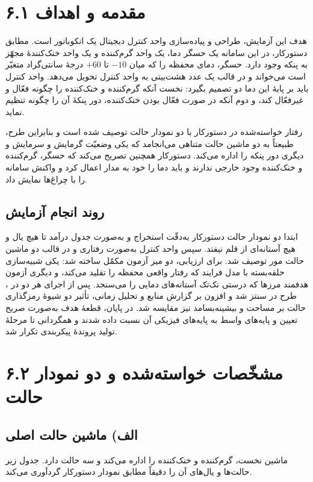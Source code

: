 \documentclass[12pt,a4paper]{article}
\begin{document}

	\section*{۶.۱ مقدمه و اهداف}
	هدف این آزمایش، طراحی و پیاده‌سازی واحد کنترل دیجیتال یک انکوباتور است. مطابق دستورکار، در این سامانه یک حسگر دما، یک واحد گرم‌کننده و یک واحد خنک‌کنندهٔ مجهّز به پنکه وجود دارد. حسگر، دمای محفظه را که میان \(-10\) تا \(+60\) درجهٔ سانتی‌گراد متغیّر است می‌خواند و در قالب یک عدد هشت‌بیتی به واحد کنترل تحویل می‌دهد. واحد کنترل باید بر پایهٔ این دما دو تصمیم بگیرد: نخست آنکه گرم‌کننده و خنک‌کننده را چگونه فعّال و غیرفعّال کند، و دوم آنکه در صورت فعّال بودن خنک‌کننده، دور پنکهٔ آن را چگونه تنظیم نماید.

	رفتار خواسته‌شده در دستورکار با دو نمودار حالت توصیف شده است و بنابراین طرح، طبیعتاً به دو ماشین حالت متناهی می‌انجامد که یکی وضعیّت گرمایش و سرمایش و دیگری دور پنکه را اداره می‌کند. دستورکار همچنین تصریح می‌کند که حسگر، گرم‌کننده و خنک‌کننده وجود خارجی ندارند و باید دما را خود به مدار اعمال کرد و واکنش سامانه را با چراغ‌ها نمایش داد.

	\subsection*{روند انجام آزمایش}
	ابتدا دو نمودار حالت دستورکار به‌دقّت استخراج و به‌صورت جدول درآمد تا هیچ یال و هیچ آستانه‌ای از قلم نیفتد. سپس واحد کنترل به‌صورت رفتاری و در قالب دو ماشین حالت مور توصیف شد. برای ارزیابی، دو میز آزمون مکمّل ساخته شد: یکی شبیه‌سازی حلقه‌بسته با مدل فرایند که رفتار واقعی محفظه را تقلید می‌کند، و دیگری آزمون هدفمند مرزها که درستی تک‌تک آستانه‌های دمایی را می‌سنجد. پس از اجرای هر دو در ، طرح در  سنتز شد و افزون بر گزارش منابع و تحلیل زمانی، تأثیر دو شیوهٔ رمزگذاری حالت بر مساحت و بیشینه‌بسامد نیز مقایسه شد. در پایان، قطعهٔ هدف به‌صورت صریح تعیین و پایه‌های واسط به پایه‌های فیزیکی آن نسبت داده شدند و همگردانی تا مرحلهٔ تولید پروندهٔ پیکربندی تکرار شد.

	\section*{۶.۲ مشخّصات خواسته‌شده و دو نمودار حالت}
	\subsection*{الف) ماشین حالت اصلی}
	ماشین نخست، گرم‌کننده و خنک‌کننده را اداره می‌کند و سه حالت دارد. جدول زیر حالت‌ها و یال‌های آن را دقیقاً مطابق نمودار دستورکار گردآوری می‌کند.
\end{document}

